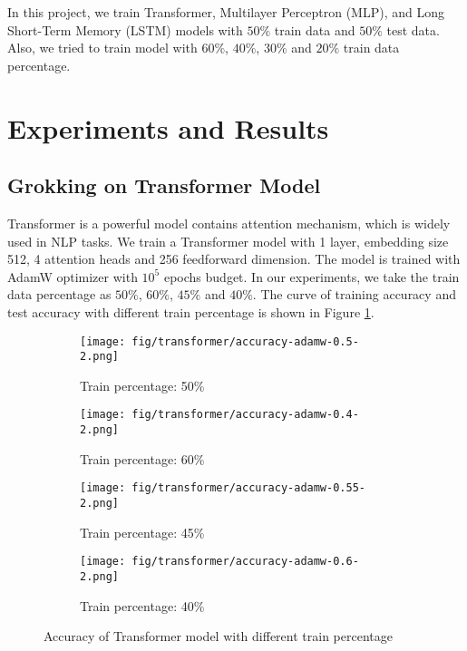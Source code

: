 \documentclass{article}
\begin{document}
In this project, we train Transformer, Multilayer Perceptron (MLP), and Long Short-Term Memory (LSTM) models with $50\%$ train data and $50\%$ test data. Also, we tried to train model with $60\%$, $40\%$, $30\%$ and $20\%$ train data percentage.

\section{Experiments and Results}

\subsection{Grokking on Transformer Model}

Transformer is a powerful model contains attention mechanism, which is widely used in NLP tasks. We train a Transformer model with 1 layer, embedding size 512, 4 attention heads and 256 feedforward dimension. The model is trained with AdamW optimizer with $10^5$ epochs budget. In our experiments, we take the train data percentage as $50\%$, $60\%$, $45\%$ and $40\%$. The curve of training accuracy and test accuracy with different train percentage is shown in Figure \ref{fig:transformer-accuracy}.

\begin{figure}[ht]
    \centering
    \begin{subfigure}{0.45\textwidth}
        \texttt{[image: fig/transformer/accuracy-adamw-0.5-2.png]}
        \caption{Train percentage: 50\%}
    \end{subfigure}
    \begin{subfigure}{0.45\textwidth}
        \texttt{[image: fig/transformer/accuracy-adamw-0.4-2.png]}
        \caption{Train percentage: 60\%}
    \end{subfigure}
    \begin{subfigure}{0.45\textwidth}
        \texttt{[image: fig/transformer/accuracy-adamw-0.55-2.png]}
        \caption{Train percentage: 45\%}
    \end{subfigure}
    \begin{subfigure}{0.45\textwidth}
        \texttt{[image: fig/transformer/accuracy-adamw-0.6-2.png]}
        \caption{Train percentage: 40\%}
    \end{subfigure}
    \caption{Accuracy of Transformer model with different train percentage}
    \label{fig:transformer-accuracy}
\end{figure}
\end{document}
